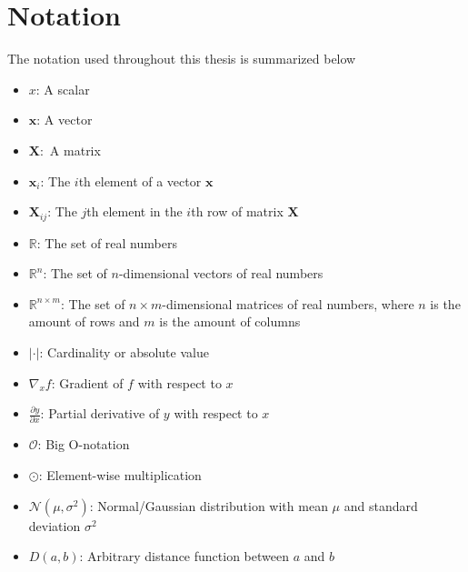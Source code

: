 \documentclass[./main.tex]{subfiles}
\begin{document}
\section{Notation}
The notation used throughout this thesis is summarized below

\begin{itemize}
    \item $x$: A scalar
    \item $\bm{x}$: A vector
    \item $\bm{X}:$ A matrix
    \item $\bm{x}_i$: The $i$th element of a vector $\bm{x}$ 
    \item $\bm{X}_{ij}$: The $j$th element in the $i$th row of matrix $\bm{X}$
    \item $\mathbb{R}$: The set of real numbers
    \item $\mathbb{R}^n$: The set of $n$-dimensional vectors of real numbers
    \item $\mathbb{R}^{n \times m}$: The set of $n \times m$-dimensional matrices of real numbers, where $n$ is the amount of rows and $m$ is the amount of columns
    \item $|\cdot|$: Cardinality or absolute value
    \item $\nabla_x f$: Gradient of $f$ with respect to $x$
    \item $\frac{\partial y}{\partial x}$: Partial derivative of $y$ with respect to $x$
    \item $\mathcal{O}$: Big O-notation
    \item $\odot$: Element-wise multiplication
    \item $\mathcal{N} \left(\mu, \sigma^2 \right)$: Normal/Gaussian distribution with mean $\mu$ and standard deviation $\sigma^2$
    \item $D(a, b)$: Arbitrary distance function between $a$ and $b$
\end{itemize}
\end{document}
